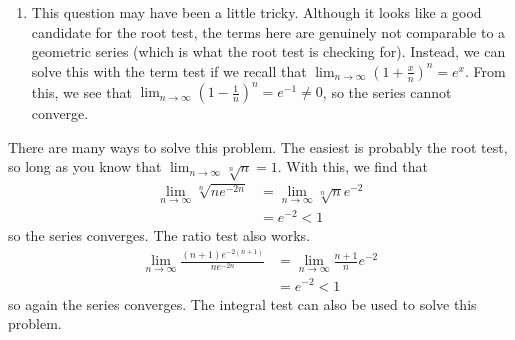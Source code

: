 {\begin{enumerate}
\begin{align*}
&= \lim_{b \to \infty} \int_{\ln(3)}^{\ln(b)} u du \\
&= \lim_{b \to \infty} \frac{1}{2}u^2|_{\ln(3)}^{\ln(b)} \\
&= \infty.
\end{align*}
From this, we see that $\sum_{n=1}^\infty \frac{\ln(n)}{n}$ does not converge.
\item This question may have been a little tricky.  Although it looks like a good candidate for the root test, the terms here are genuinely not comparable to a geometric series (which is what the root test is checking for).  Instead, we can solve this with the term test if we recall that $\lim_{n \to \infty} \left(1 + \frac{x}{n}\right)^n = e^x$.  From this, we see that $\lim_{n \to \infty} \left(1 - \frac{1}{n}\right)^n = e^{-1} \neq 0$, so the series cannot converge.
\end{enumerate}
}


{%
There are many ways to solve this problem.  The easiest is probably the root test, so long as you know that $\lim_{n \to \infty} \sqrt[n]{n} = 1$.  With this, we find that
\begin{align*}
\lim_{n \to \infty} \sqrt[n]{ne^{-2n}} &= \lim_{n \to \infty} \sqrt[n]{n} e^{-2} \\
&= e^{-2} < 1
\end{align*}
so the series converges.  The ratio test also works.
\begin{align*}
\lim_{n \to \infty} \frac{(n+1)e^{-2(n+1)}}{ne^{-2n}} &= \lim_{n \to \infty} \frac{n+1}{n} e^{-2} \\
&= e^{-2} < 1
\end{align*}
so again the series converges.  The integral test can also be used to solve this problem.
}
